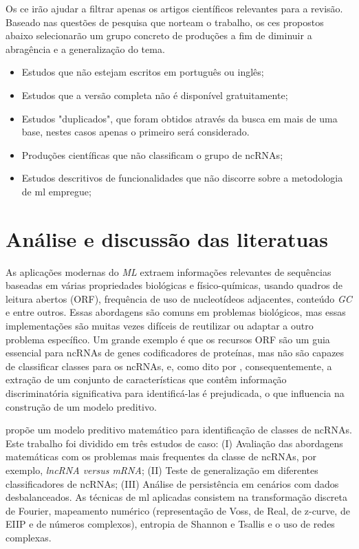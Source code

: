 Os \ac{ce} irão ajudar a filtrar apenas os artigos científicos relevantes para a revisão. Baseado nas questões de pesquisa que norteam o trabalho, os \ac{ce}s propostos abaixo selecionarão um grupo concreto de produções a fim de diminuir a abragência e a generalização do tema.

\begin{itemize}
    \item Estudos que não estejam escritos em português ou inglês;
    \item Estudos que a versão completa não é disponível gratuitamente;
    \item  Estudos "duplicados", que foram obtidos através da busca em mais de uma base, nestes casos apenas o primeiro será considerado.
    \item Produções científicas que não classificam o grupo de \ac{ncRNAs};
    \item Estudos descritivos de funcionalidades que não discorre sobre a metodologia de \ac{ml} empregue;
\end{itemize}


\section{Análise e discussão das literatuas}

As aplicações modernas do \textit{ML}  extraem informações relevantes de sequências baseadas em várias propriedades biológicas e físico-químicas, usando quadros de leitura abertos (ORF), frequência de uso de nucleotídeos adjacentes, conteúdo \textit{GC} e entre outros. Essas abordagens são comuns em problemas biológicos, mas essas implementações são muitas vezes difíceis de reutilizar ou adaptar a outro problema específico. Um grande exemplo é que os recursos ORF são um guia essencial para \ac{ncRNAs} de genes codificadores de proteínas, mas não são capazes de classificar classes para os ncRNAs, e, como dito por \cite{lncRNAs-article}, consequentemente, a extração de um conjunto de características que contêm informação discriminatória significativa para identificá-las é prejudicada, o que influencia na construção de um modelo preditivo. 


\cite{math-feature-bio} propõe um modelo preditivo matemático para identificação de classes de ncRNAs. Este trabalho foi dividido em três estudos de caso: (I) Avaliação das abordagens matemáticas com os problemas mais frequentes da classe de ncRNAs, por exemplo, \textit{lncRNA versus mRNA}; (II) Teste de generalização em diferentes classificadores de ncRNAs; (III) Análise de persistência em cenários com dados desbalanceados. As técnicas de \ac{ml} aplicadas consistem na transformação discreta de Fourier, mapeamento numérico (representação de Voss, de Real, de z-curve, de EIIP e de números complexos), entropia de Shannon e Tsallis e o uso de redes complexas. 

